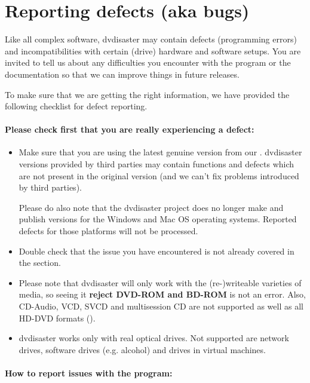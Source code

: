 \section{Reporting defects (aka bugs)}
\label{reporting-defects}

Like all complex software, dvdisaster may contain defects (programming errors) and
incompatibilities with certain (drive) hardware and software setups. You are invited
to tell us about any difficulties you encounter with the program or the documentation
so that we can improve things in future releases.

To make sure that we are getting the right information, we have provided the
following checklist for defect reporting.

\paragraph{Please check first that you are really experiencing a defect:}\quad
\medskip

\begin{itemize}
\item Make sure that you are using the latest genuine version from
  our . dvdisaster versions provided
  by third parties may contain functions and defects which are not present
  in the original version (and we can't fix problems introduced by third parties).

  Please do also note that the dvdisaster project does no longer
  make and publish versions for the Windows and Mac OS operating
  systems. Reported defects for those platforms will not be processed.

\item Double check that the issue you have encountered is not already
  covered in the  section.
\item Please note that dvdisaster will only work with the (re-)writeable varieties
  of media, so seeing it {\bf reject DVD-ROM and BD-ROM} is not an error.
  Also, CD-Audio, VCD, SVCD and multisession CD are not supported as well as
  all HD-DVD formats ().
\item dvdisaster works only with real optical drives. Not supported are
  network drives, software drives (e.g. alcohol) and drives in virtual machines.
\end{itemize}

\paragraph{How to report issues with the program:}\quad
\medskip

